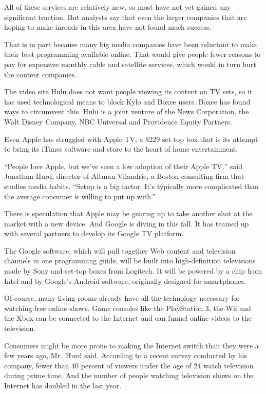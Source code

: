 ﻿\documentclass[12pt]{article}
\begin{document}
All of these services are relatively new, so most have not yet gained any significant traction. But
analysts say that even the larger companies that are hoping to make inroads in this area have not
found much success.

That is in part because many big media companies have been reluctant to make their best programming
available online. That would give people fewer reasons to pay for expensive monthly cable and
satellite services, which would in turn hurt the content companies.

The video site Hulu does not want people viewing its content on TV sets, so it has used
technological means to block Kylo and Boxee users. Boxee has found ways to circumvent this. Hulu is
a joint venture of the News Corporation, the Walt Disney Company, NBC Universal and Providence
Equity Partners.

Even Apple has struggled with Apple TV, a \$229 set-top box that is its attempt to bring its iTunes
software and store to the heart of home entertainment.

``People love Apple, but we've seen a low adoption of their Apple TV,'' said Jonathan Hurd, director
of Altman Vilandrie, a Boston consulting firm that studies media habits. ``Setup is a big factor.
It's typically more complicated than the average consumer is willing to put up with.''

There is speculation that Apple may be gearing up to take another shot at the market with a new
device. And Google is diving in this fall. It has teamed up with several partners to develop its
Google TV platform.

The Google software, which will pull together Web content and television channels in one programming
guide, will be built into high-definition televisions made by Sony and set-top boxes from Logitech.
It will be powered by a chip from Intel and by Google's Android software, originally designed for
smartphones.

Of course, many living rooms already have all the technology necessary for watching free online
shows. Game consoles like the PlayStation 3, the Wii and the Xbox can be connected to the Internet
and can funnel online videos to the television.

Consumers might be more prone to making the Internet switch than they were a few years ago, Mr.~Hurd
said. According to a recent survey conducted by his company, fewer than 40 percent of viewers under
the age of 24 watch television during prime time. And the number of people watching television shows
on the Internet has doubled in the last year.
\end{document}
